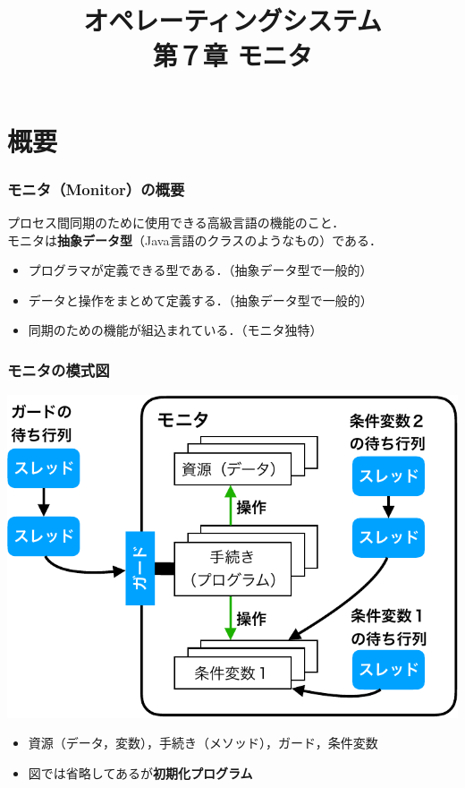 \documentclass[dvipdfmx]{beamer}
\begin{document}
\title[OS]{オペレーティングシステム\\第７章 モニタ}
\date{}

\begin{frame}
  \titlepage
\end{frame}


\section{概要}
\begin{frame}
  \frametitle{モニタ（Monitor）の概要}

プロセス間同期のために使用できる高級言語の機能のこと．\\
モニタは{\bf 抽象データ型}（Java言語のクラスのようなもの）である．

\begin{itemize}
\item プログラマが定義できる型である．（抽象データ型で一般的）
\item データと操作をまとめて定義する．（抽象データ型で一般的）
\item 同期のための機能が組込まれている．（モニタ独特）
\end{itemize}
\end{frame}

\begin{frame}
  \frametitle{モニタの模式図}
  \begin{center}
    \includegraphics[scale=0.6]{Fig/monitor-crop.pdf}
  \end{center}
  \begin{itemize}
  \item 資源（データ，変数），手続き（メソッド），ガード，条件変数
  \item 図では省略してあるが{\bf 初期化プログラム}
  \end{itemize}
\end{frame}
\end{document}
